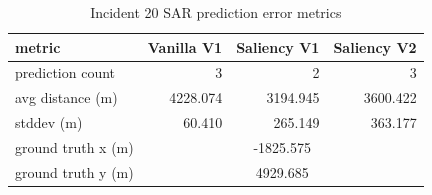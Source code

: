 \begin{table}[ht]
\centering
\caption{Incident 20 SAR prediction error metrics}
\label{tab:sar-incident-20}
\begin{tabular}{lrrr}
\hline
metric & Vanilla V1 & Saliency V1 & Saliency V2 \\
\hline
prediction count & 3 & 2 & 3 \\
avg distance (m) & 4228.074 & 3194.945 & 3600.422 \\
stddev (m) & 60.410 & 265.149 & 363.177 \\
ground truth x (m) & \multicolumn{3}{c}{-1825.575} \\
ground truth y (m) & \multicolumn{3}{c}{4929.685} \\
\hline
\end{tabular}
\end{table}
